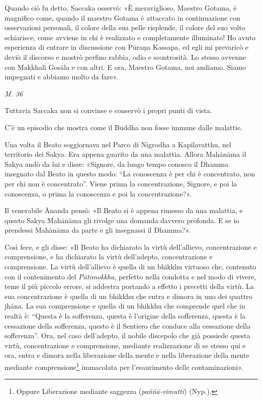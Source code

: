 Quando ciò fu detto, Saccaka osservò: «È meraviglioso, Maestro Gotama, è
magnifico come, quando il maestro Gotama è attaccato in continuazione
con osservazioni personali, il colore della sua pelle risplende, il
colore del suo volto schiarisce, come avviene in chi è realizzato e
completamente illuminato! Ho avuto esperienza di entrare in discussione
con Pūraṇa Kassapa, ed egli mi prevaricò e deviò il discorso e mostrò
perfino rabbia, odio e scontrosità. Lo stesso avvenne con Makkhali
Gosāla e con altri. E ora, Maestro Gotama, noi andiamo. Siamo impegnati
e abbiamo molto da fare».


\emph{M. 36}


 Tuttavia Saccaka non si convinse e conservò i propri
punti di vista.


 C’è un episodio che mostra come il Buddha non fosse
immune dalle malattie.


 Una volta il Beato soggiornava nel Parco di Nigrodha a
Kapilavatthu, nel territorio dei Sakya. Era appena guarito da una
malattia. Allora Mahānāma il Sakya andò da lui e disse: «Signore, da
lungo tempo conosco il Dhamma insegnato dal Beato in questo modo: “La
conoscenza è per chi è concentrato, non per chi non è concentrato”.
Viene prima la concentrazione, Signore, e poi la conoscenza, o prima la
conoscenza e poi la concentrazione?».


Il venerabile Ānanda pensò: «Il Beato si è appena rimesso da una
malattia, e questo Sakya Mahānāma gli rivolge una domanda davvero
profonda. E se io prendessi Mahānāma da parte e gli insegnassi il
Dhamma?».


Così fece, e gli disse: «Il Beato ha dichiarato la virtù dell’allievo,
concentrazione e comprensione, e ha dichiarato la virtù dell’adepto,
concentrazione e comprensione. La virtù dell’allievo è quella di un
bhikkhu virtuoso che, contenuto con il contenimento del \emph{Pātimokkha},
perfetto nella condotta e nel modo di vivere, teme il più piccolo
errore, si addestra portando a effetto i precetti della virtù. La sua
concentrazione è quella di un bhikkhu che entra e dimora in uno dei
quattro jhāna. La sua comprensione e quella di un bhikkhu che comprende
quel che in realtà è: “Questa è la sofferenza, questa è l’origine della
sofferenza, questa è la cessazione della sofferenza, questo è il
Sentiero che conduce alla cessazione della sofferenza”. Ora, nel caso
dell’adepto, il nobile discepolo che già possiede questa virtù,
concentrazione e comprensione, mediante realizzazione di se stesso qui e
ora, entra e dimora nella liberazione della mente e nella liberazione
della mente mediante comprensione\footnote{Oppure Liberazione mediante saggezza (\emph{paññā-vimutti}) (Nyp.).} immacolata per
l’esaurimento delle contaminazioni».


